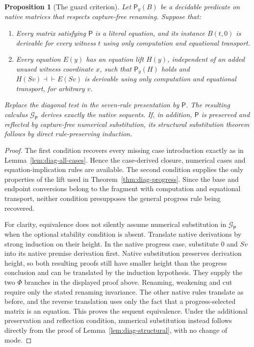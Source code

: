 \documentclass[11pt]{article}
\newtheorem{proposition}[theorem]{Proposition}
\theoremstyle{definition}
\theoremstyle{remark}
\begin{document}
\begin{proposition}[The guard criterion]
\label{prop:diag-guard-criterion}
Let $\mathsf P_y(B)$ be a decidable predicate on native matrices that
respects capture-free renaming.  Suppose that:
\begin{enumerate}
\item Every matrix satisfying $\mathsf P$ is a literal equation, and
  its instance $B(t,0)$ is derivable for every witness $t$ using only
  computation and equational transport.
\item Every equation $E(y)$ has an equation lift $H(y)$, independent
  of an added unused witness coordinate $x$, such that
  $\mathsf P_y(H)$ holds and
  $H(Sv)\dashv\vdash E(Sv)$ is derivable using only computation
  and equational transport, for arbitrary $v$.
\end{enumerate}
Replace the diagonal test in the seven-rule presentation by $\mathsf P$.
The resulting calculus $\mathcal G_{\mathsf P}$ derives exactly the
native sequents.  If, in addition, $\mathsf P$ is preserved and reflected
by capture-free numerical substitution, its structural substitution
theorem follows by direct rule-preserving induction.
\end{proposition}
\begin{proof}
The first condition recovers every missing case introduction exactly as
in Lemma~\ref{lem:diag-all-cases}.  Hence the case-derived closure,
numerical cases and equation-implication rules are available.
The second condition supplies the only properties of the lift used in
Theorem~\ref{thm:diag-progress}.  Since the base and endpoint conversions
belong to the fragment with computation and equational transport, neither
condition presupposes the general progress rule being recovered.

For clarity, equivalence does not silently assume numerical substitution
in $\mathcal G_{\mathsf P}$ when the optional stability condition is
absent.  Translate native derivations by strong induction on their height.
In the native progress case, substitute $0$ and $Sv$ into its native
premise derivation first.  Native substitution preserves derivation
height, so both resulting proofs still have smaller height than the
progress conclusion and can be translated by the induction hypothesis.
They supply the two $\Phi$ branches in the displayed proof above.
Renaming, weakening and cut require only the stated renaming invariance.
The other native rules translate as before, and the reverse translation
uses only the fact that a progress-selected matrix is an equation.
This proves the sequent equivalence.  Under the additional preservation
and reflection condition, numerical substitution instead follows directly
from the proof of Lemma~\ref{lem:diag-structural}, with no change of mode.
\end{proof}
\end{document}
